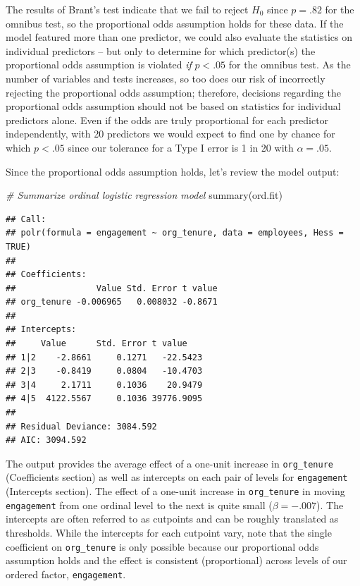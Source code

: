 \documentclass[
]{book}
\newenvironment{Shaded}{\begin{snugshade}}{\end{snugshade}}
\newcommand{\CommentTok}[1]{\textcolor[rgb]{0.56,0.35,0.01}{\textit{#1}}}
\newcommand{\FunctionTok}[1]{\textcolor[rgb]{0.00,0.00,0.00}{#1}}
\newcommand{\NormalTok}[1]{#1}
\begin{document}
The results of Brant's test indicate that we fail to reject \(H_0\) since \(p = .82\) for the omnibus test, so the proportional odds assumption holds for these data. If the model featured more than one predictor, we could also evaluate the statistics on individual predictors -- but only to determine for which predictor(s) the proportional odds assumption is violated \emph{if} \(p < .05\) for the omnibus test. As the number of variables and tests increases, so too does our risk of incorrectly rejecting the proportional odds assumption; therefore, decisions regarding the proportional odds assumption should not be based on statistics for individual predictors alone. Even if the odds are truly proportional for each predictor independently, with 20 predictors we would expect to find one by chance for which \(p < .05\) since our tolerance for a Type I error is 1 in 20 with \(\alpha = .05\).

Since the proportional odds assumption holds, let's review the model output:

\begin{Shaded}
\begin{Highlighting}[]
\CommentTok{\# Summarize ordinal logistic regression model}
\FunctionTok{summary}\NormalTok{(ord.fit)}
\end{Highlighting}
\end{Shaded}

\begin{verbatim}
## Call:
## polr(formula = engagement ~ org_tenure, data = employees, Hess = TRUE)
## 
## Coefficients:
##                Value Std. Error t value
## org_tenure -0.006965   0.008032 -0.8671
## 
## Intercepts:
##     Value      Std. Error t value   
## 1|2    -2.8661     0.1271   -22.5423
## 2|3    -0.8419     0.0804   -10.4703
## 3|4     2.1711     0.1036    20.9479
## 4|5  4122.5567     0.1036 39776.9095
## 
## Residual Deviance: 3084.592 
## AIC: 3094.592
\end{verbatim}

The output provides the average effect of a one-unit increase in \texttt{org\_tenure} (Coefficients section) as well as intercepts on each pair of levels for \texttt{engagement} (Intercepts section). The effect of a one-unit increase in \texttt{org\_tenure} in moving \texttt{engagement} from one ordinal level to the next is quite small (\(\beta = -.007\)). The intercepts are often referred to as cutpoints and can be roughly translated as thresholds. While the intercepts for each cutpoint vary, note that the single coefficient on \texttt{org\_tenure} is only possible because our proportional odds assumption holds and the effect is consistent (proportional) across levels of our ordered factor, \texttt{engagement}.
\end{document}
